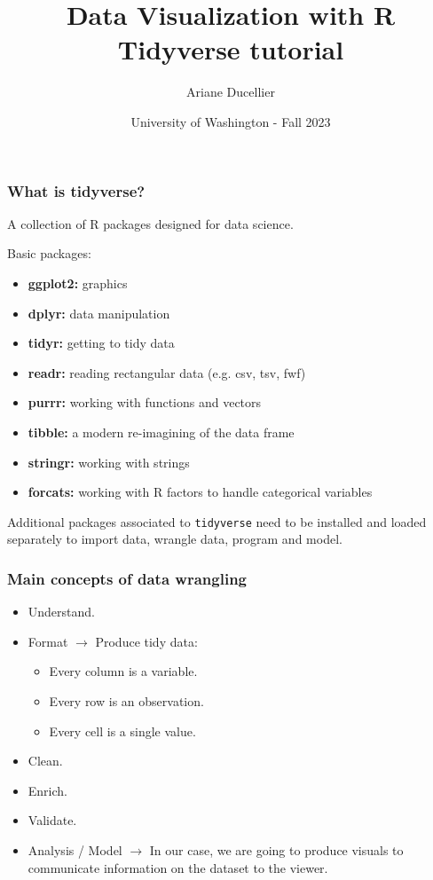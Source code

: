 \documentclass{beamer}
\title[Data Visualization with R - Tidyverse tutorial]{Data Visualization with R \\ Tidyverse tutorial}
\author{Ariane Ducellier}
\date{University of Washington - Fall 2023}
\begin{document}
	\begin{frame}
		\titlepage
	\end{frame}

	\begin{frame}[fragile]
		\frametitle{What is tidyverse?}

		A collection of R packages designed for data science.

		\vspace{1em}

		Basic packages:
		\begin{itemize}
			\item \textbf{ggplot2:} graphics
			\item \textbf{dplyr:} data manipulation
			\item \textbf{tidyr:} getting to tidy data
			\item \textbf{readr:} reading rectangular data (e.g. csv, tsv, fwf)
			\item \textbf{purrr:} working with functions and vectors
			\item \textbf{tibble:} a modern re-imagining of the data frame
			\item \textbf{stringr:} working with strings
			\item \textbf{forcats:} working with R factors to handle categorical variables
		\end{itemize}

		\vspace{1em}

		Additional packages associated to \verb|tidyverse| need to be installed and loaded separately to import data, wrangle data, program and model.		
		
	\end{frame}

	\begin{frame}
		\frametitle{Main concepts of data wrangling}

		\begin{itemize}
		\setlength{\itemsep}{1em}
			\item Understand.
			\item Format $\rightarrow$ Produce tidy data:
			\begin{itemize}
				\item Every column is a variable.
				\item Every row is an observation.
				\item Every cell is a single value.
			\end{itemize}
			\item Clean.
			\item Enrich.
			\item Validate.
			\item Analysis / Model $\rightarrow$ In our case, we are going to produce visuals to communicate information on the dataset to the viewer.
		\end{itemize}

	\end{frame}
\end{document}
